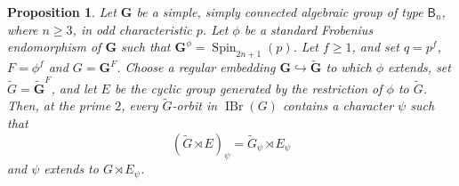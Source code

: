 \documentclass[10pt]{amsart}
\newtheorem{proposition}[theorem]{Proposition}
\theoremstyle{definition}
\renewcommand{\geq}{\geqslant}
\DeclareMathOperator{\IBr}{IBr}
\numberwithin{equation}{section}
\numberwithin{table}{section}
\begin{document}
\begin{proposition}\label{prop:type-b-brauer-hypothesis}
Let $\mathbf G$ be a simple, simply connected algebraic group of type
$\mathsf B_n$, where $n\geq3$, in odd characteristic $p$.
Let $\phi$ be a standard Frobenius endomorphism of $\mathbf G$
such that $\mathbf G^\phi=\operatorname{Spin}_{2n+1}(p)$.
Let $f\geq1$, and set $q=p^f$, $F=\phi^f$ and $G=\mathbf G^F$.
Choose a regular embedding
$\mathbf G\hookrightarrow\widetilde{\mathbf G}$ to which $\phi$
extends, set $\widetilde G=\widetilde{\mathbf G}^F$, and let $E$ be
the cyclic group generated by the restriction of $\phi$ to
$\widetilde G$.
Then, at the prime $2$, every $\widetilde G$-orbit in $\IBr(G)$ contains
a character $\psi$ such that
\[
 (\widetilde G\rtimes E)_\psi
   =\widetilde G_\psi\rtimes E_\psi
\]
and $\psi$ extends to $G\rtimes E_\psi$.
\end{proposition}
\end{document}
